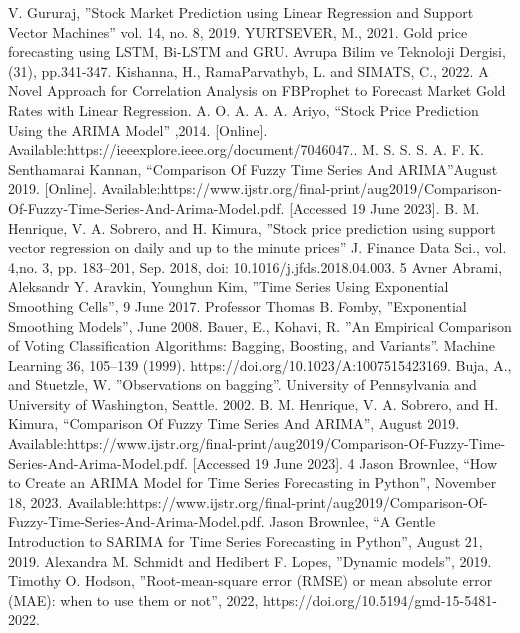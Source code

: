 \documentclass{ieeeojies}
\begin{document}
\begin{thebibliography}{00}
 V. Gururaj,  ''Stock Market Prediction using Linear Regression and Support Vector Machines'' vol. 14, no. 8, 2019.
 YURTSEVER, M., 2021. Gold price forecasting using LSTM, Bi-LSTM and GRU. Avrupa Bilim ve Teknoloji Dergisi, (31), pp.341-347.
 Kishanna, H., RamaParvathyb, L. and SIMATS, C., 2022. A Novel Approach for Correlation Analysis on FBProphet to Forecast Market Gold Rates with Linear Regression.
 A. O. A. A. A. Ariyo, ``Stock Price Prediction Using the ARIMA Model'' ,2014. [Online]. Available:https://ieeexplore.ieee.org/document/7046047..
 M. S. S. S. A. F. K. Senthamarai Kannan, ``Comparison Of Fuzzy Time Series And ARIMA''August 2019. [Online]. Available:https://www.ijstr.org/final-print/aug2019/Comparison-Of-Fuzzy-Time-Series-And-Arima-Model.pdf. [Accessed 19 June 2023].
 B. M. Henrique, V. A. Sobrero, and H. Kimura, ''Stock price prediction using support vector regression on daily and up to the minute prices'' J. Finance Data Sci., vol. 4,no. 3, pp. 183–201, Sep. 2018, doi: 10.1016/j.jfds.2018.04.003. 5
Avner Abrami, Aleksandr Y. Aravkin, Younghun Kim, ''Time Series Using Exponential Smoothing Cells'', 9 June 2017.
  Professor Thomas B. Fomby, ''Exponential Smoothing Models'', June 2008.
 Bauer, E., Kohavi, R. ''An Empirical Comparison of Voting Classification Algorithms: Bagging, Boosting, and Variants''. Machine Learning 36, 105–139 (1999). https://doi.org/10.1023/A:1007515423169.
 Buja, A., and Stuetzle, W. ''Observations on bagging''. University of Pennsylvania and University of Washington, Seattle. 2002.
 B. M. Henrique, V. A. Sobrero, and H. Kimura, ``Comparison Of Fuzzy Time Series And ARIMA'', August 2019. Available:https://www.ijstr.org/final-print/aug2019/Comparison-Of-Fuzzy-Time-Series-And-Arima-Model.pdf. [Accessed 19 June 2023]. 4
 Jason Brownlee, ``How to Create an ARIMA Model for Time Series Forecasting in Python'', November 18, 2023. Available:https://www.ijstr.org/final-print/aug2019/Comparison-Of-Fuzzy-Time-Series-And-Arima-Model.pdf. 
 Jason Brownlee, ``A Gentle Introduction to SARIMA for Time Series Forecasting in Python'', August 21, 2019. 
 Alexandra M. Schmidt and Hedibert F. Lopes, ''Dynamic models'', 2019. 
 Timothy O. Hodson, ''Root-mean-square error (RMSE) or mean absolute error (MAE): when to use them or not'', 2022, https://doi.org/10.5194/gmd-15-5481-2022.

\end{thebibliography}
\end{document}
